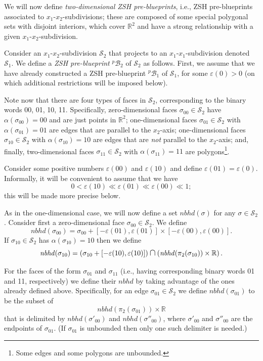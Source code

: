 \documentclass[12pt,letterpaper]{article}
\renewcommand{\S}{\mathcal{S}}
\newcommand{\B}{\mathcal{B}}
\newcommand{\RR}{\mathbb{R}}
\newcommand{\eps}{\varepsilon}
\newcommand*{\medcap}{\mathbin{\scalebox{1.25}{\ensuremath{\cap}}}}%
\newcommand{\nbhd}{\mathit{nbhd}}
\renewcommand{\a}{\alpha}
\begin{document}
\bigskip

We will now define {\em two-dimensional ZSH pre-blueprints}, i.e.,  ZSH pre-blueprints associated to $x_1$-$x_2$-subdivisions; these are composed of some special polygonal sets with disjoint interiors, which cover $\RR^2$ and have a strong relationship with a given $x_1$-$x_2$-subdivision. 

Consider an $x_1$-$x_2$-subdivision $\S_2$ that projects to an $x_1$-$x_1$-subdivision denoted $\S_1$. We define a  {\em ZSH pre-blueprint} $^p\!\B_2$ of $\S_2$ as follows. First, we assume that we have already constructed a ZSH pre-blueprint $^p\!\B_1$ of $\S_1$, for some $\eps(0) > 0$ (on which additional restrictions will be imposed below).

\noindent
Note now that there are four types of faces in $\S_2$, corresponding to the binary words 00, 01, 10, 11. Specifically, zero-dimensional faces $\sigma_{00} \in \S_2$ have $\a(\sigma_{00}) = 00$ and are just points in $\RR^2$; one-dimensional faces $\sigma_{01} \in \S_2$ with $\a(\sigma_{01}) = 01$ are edges that are parallel to the $x_2$-axis; one-dimensional faces $\sigma_{10} \in \S_2$ with $\a(\sigma_{10}) = 10$ are edges that are {\em not} parallel to the $x_2$-axis; and, finally, two-dimensional faces $\sigma_{11} \in \S_2$ with $\a(\sigma_{11}) = 11$ are polygons\footnote{Some edges and some polygons are unbounded.}. 

\noindent
Consider some positive numbers $\eps(00)$ and $\eps(10)$ and define $\eps(01) = \eps(0)$. Informally, it will be convenient to assume that we have 
$$
0 < \eps(10) \ll \eps(01) \ll \eps(00) \ll1; 
$$
this will be made more precise below. 

\noindent
As in the one-dimensional case, we will now define a set $\nbhd(\sigma)$ for any $\sigma \in \S_2$.
Consider first a zero-dimensional face  $\sigma_{00} \in \S_2$. We define 
$$
\nbhd(\sigma_{00}) = \sigma_{00} + [ - \eps(01), \eps(01) ] \times  [ - \eps(00), \eps(00) ].
$$
If $\sigma_{10} \in \S_2$ has $\a(\sigma_{10}) = 10$ then we define
$$
\nbhd(\sigma_{10}) = \left( \sigma_{10} +  [ - \eps(10), \eps(10) ] \right) \medcap \left( \nbhd(\pi_2(\sigma_{10}))\times\RR \right).
$$

\noindent
For the faces of the form $\sigma_{01}$ and $\sigma_{11}$ (i.e., having corresponding binary words 01 and 11, respectively) we define their $\nbhd$ by taking advantage of the ones already defined above. Specifically, for an edge $\sigma_{01} \in \S_2$ we define $\nbhd(\sigma_{01})$ to be the subset of 
$$
\nbhd(\pi_2(\sigma_{01})) \times \RR
$$
that is delimited by $\nbhd(\sigma'_{00})$ and $\nbhd(\sigma''_{00})$, where $\sigma'_{00}$ and $\sigma''_{00}$ are the endpoints of $\sigma_{01}$. (If $\sigma_{01}$ is unbounded then only one such delimiter is needed.)
\end{document}
